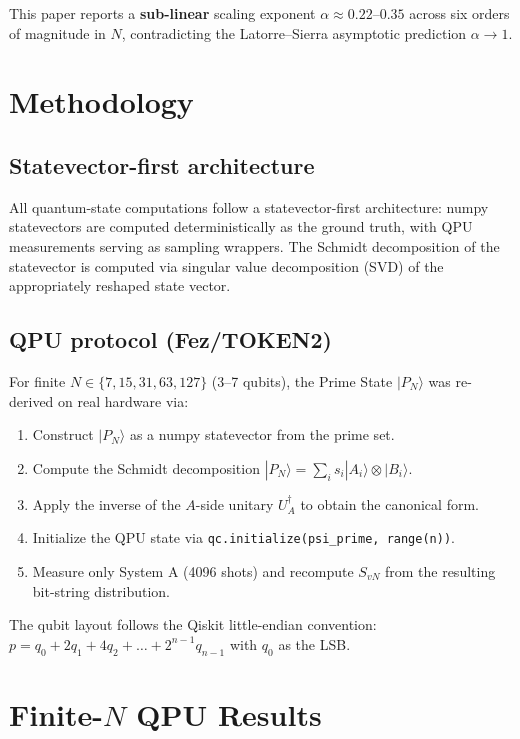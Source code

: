 \documentclass[11pt,a4paper]{article}
\begin{document}
This paper reports a \textbf{sub-linear} scaling exponent $\alpha \approx 0.22$--$0.35$ across six orders of magnitude in $N$, contradicting the Latorre--Sierra asymptotic prediction $\alpha \to 1$.

\section{Methodology}

\subsection{Statevector-first architecture}

All quantum-state computations follow a statevector-first architecture: numpy statevectors are computed deterministically as the ground truth, with QPU measurements serving as sampling wrappers. The Schmidt decomposition of the statevector is computed via singular value decomposition (SVD) of the appropriately reshaped state vector.

\subsection{QPU protocol (Fez/TOKEN2)}

For finite $N \in \{7, 15, 31, 63, 127\}$ (3--7 qubits), the Prime State $|P_N\rangle$ was re-derived on real hardware via:
\begin{enumerate}
\item Construct $|P_N\rangle$ as a numpy statevector from the prime set.
\item Compute the Schmidt decomposition $|P_N\rangle = \sum_i s_i |A_i\rangle \otimes |B_i\rangle$.
\item Apply the inverse of the $A$-side unitary $U_A^\dagger$ to obtain the canonical form.
\item Initialize the QPU state via \texttt{qc.initialize(psi\_prime, range(n))}.
\item Measure only System A (4096 shots) and recompute $S_{vN}$ from the resulting bit-string distribution.
\end{enumerate}

The qubit layout follows the Qiskit little-endian convention: $p = q_0 + 2q_1 + 4q_2 + \dots + 2^{n-1}q_{n-1}$ with $q_0$ as the LSB.

\section{Finite-$N$ QPU Results}
\end{document}
